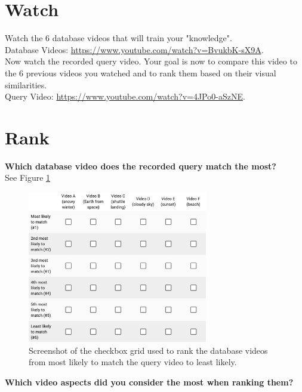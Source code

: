 \section{Watch}

Watch the 6 database videos that will train your "knowledge".\\

Database Videos: \url{https://www.youtube.com/watch?v=BvukbK-sX9A}.\\

Now watch the recorded query video. Your goal is now to compare this video to the 6 previous videos you watched and to rank them based on their visual similarities.\\

Query Video: \url{https://www.youtube.com/watch?v=4JPo0-aSzNE}.

\section{Rank}

\textbf{Which database video does the recorded query match the most?}\\

See Figure \ref{fig:appendix_survey_video_ranking}\\

\begin{figure}[h] 
\centerline{\includegraphics[width=0.70\textwidth]{figures/appendix/survey_video_ranking.png}}
\caption{\label{fig:appendix_survey_video_ranking}Screenshot of the checkbox grid used to rank the database videos from most likely to match the query video to least likely.}
\end{figure}

\textbf{Which video aspects did you consider the most when ranking them?}\\

